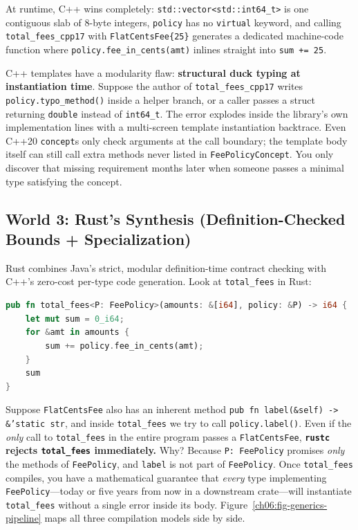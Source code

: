 At runtime, C++ wins completely: \texttt{std::vector<std::int64\_t>} is one contiguous slab of 8-byte integers, \texttt{policy} has no \texttt{virtual} keyword, and calling \texttt{total\_fees\_cpp17} with \texttt{FlatCentsFee\{25\}} generates a dedicated machine-code function where \texttt{policy.fee\_in\_cents(amt)} inlines straight into \texttt{sum += 25}.

C++ templates have a modularity flaw: \textbf{structural duck typing at instantiation time}. Suppose the author of \texttt{total\_fees\_cpp17} writes \texttt{policy.typo\_method()} inside a helper branch, or a caller passes a struct returning \texttt{double} instead of \texttt{int64\_t}. The error explodes inside the library's own implementation lines with a multi-screen template instantiation backtrace. Even C++20 \texttt{concept}s only check arguments at the call boundary; the template body itself can still call extra methods never listed in \texttt{FeePolicyConcept}. You only discover that missing requirement months later when someone passes a minimal type satisfying the concept.

\subsection{World 3: Rust's Synthesis (Definition-Checked Bounds + Specialization)}

Rust combines Java's strict, modular definition-time contract checking with C++'s zero-cost per-type code generation. Look at \texttt{total\_fees} in Rust:

\begin{lstlisting}[language=Rust, caption={Rust checks generic bodies strictly against trait bounds once at definition time, then compiles specialized machine code per concrete type.}]
pub fn total_fees<P: FeePolicy>(amounts: &[i64], policy: &P) -> i64 {
    let mut sum = 0_i64;
    for &amt in amounts {
        sum += policy.fee_in_cents(amt);
    }
    sum
}
\end{lstlisting}

Suppose \texttt{FlatCentsFee} also has an inherent method \texttt{pub fn label(\&self) -> \&'static str}, and inside \texttt{total\_fees} we try to call \texttt{policy.label()}. Even if the \emph{only} call to \texttt{total\_fees} in the entire program passes a \texttt{FlatCentsFee}, \textbf{\texttt{rustc} rejects \texttt{total\_fees} immediately.} Why? Because \texttt{P: FeePolicy} promises \emph{only} the methods of \texttt{FeePolicy}, and \texttt{label} is not part of \texttt{FeePolicy}. Once \texttt{total\_fees} compiles, you have a mathematical guarantee that \emph{every} type implementing \texttt{FeePolicy}---today or five years from now in a downstream crate---will instantiate \texttt{total\_fees} without a single error inside its body. Figure~\ref{ch06:fig-generics-pipeline} maps all three compilation models side by side.

